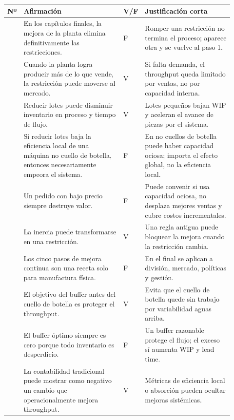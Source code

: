 \documentclass[
  11pt,
]{article}
\begin{document}
\begin{landscape}
\footnotesize
\setlength{\tabcolsep}{4pt}
\renewcommand{\arraystretch}{1.12}
\begin{longtable}{@{}
  >{\raggedleft\arraybackslash}p{0.035\linewidth}
  >{\RaggedRight\arraybackslash}p{0.445\linewidth}
  >{\centering\arraybackslash}p{0.045\linewidth}
  >{\RaggedRight\arraybackslash}p{0.395\linewidth}@{}}
\toprule
\textbf{Nº} & \textbf{Afirmación} & \textbf{V/F} & \textbf{Justificación corta} \\
\midrule
\endhead
\bottomrule
\endlastfoot
1 & En los capítulos finales, la mejora de la planta elimina definitivamente las restricciones. & F & Romper una restricción no termina el proceso; aparece otra y se vuelve al paso 1. \\
2 & Cuando la planta logra producir más de lo que vende, la restricción puede moverse al mercado. & V & Si falta demanda, el throughput queda limitado por ventas, no por capacidad interna. \\
3 & Reducir lotes puede disminuir inventario en proceso y tiempo de flujo. & V & Lotes pequeños bajan WIP y aceleran el avance de piezas por el sistema. \\
4 & Si reducir lotes baja la eficiencia local de una máquina no cuello de botella, entonces necesariamente empeora el sistema. & F & En no cuellos de botella puede haber capacidad ociosa; importa el efecto global, no la eficiencia local. \\
5 & Un pedido con bajo precio siempre destruye valor. & F & Puede convenir si usa capacidad ociosa, no desplaza mejores ventas y cubre costos incrementales. \\
6 & La inercia puede transformarse en una restricción. & V & Una regla antigua puede bloquear la mejora cuando la restricción cambia. \\
7 & Los cinco pasos de mejora continua son una receta solo para manufactura física. & F & En el final se aplican a división, mercado, políticas y gestión. \\
8 & El objetivo del buffer antes del cuello de botella es proteger el throughput. & V & Evita que el cuello de botella quede sin trabajo por variabilidad aguas arriba. \\
9 & El buffer óptimo siempre es cero porque todo inventario es desperdicio. & F & Un buffer razonable protege el flujo; el exceso sí aumenta WIP y lead time. \\
10 & La contabilidad tradicional puede mostrar como negativo un cambio que operacionalmente mejora throughput. & V & Métricas de eficiencia local o absorción pueden ocultar mejoras sistémicas. \\

\end{longtable}
\end{landscape}
\end{document}
